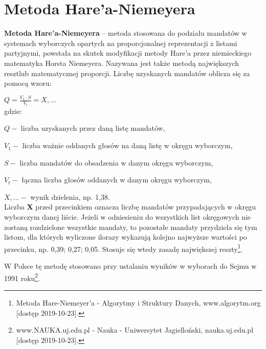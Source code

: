 \documentclass[12pt,a4paper,titlepage]{report}
\begin{document}
\chapter{Metoda Hare’a-Niemeyera}
\textbf{Metoda Hare’a-Niemeyera} – metoda stosowana do podziału mandatów w systemach wyborczych opartych na proporcjonalnej reprezentacji z listami partyjnymi, powstała na skutek modyfikacji metody Hare’a przez niemieckiego matematyka Horsta Niemeyera. Nazywana jest także metodą największych reszt\footnotemark[1] lub matematycznej proporcji.
Liczbę uzyskanych mandatów oblicza się za pomocą wzoru\footnotemark[1]:

\begin{math} Q={\frac {V_{1}\cdot S}{V_{t}}}=X,...\end{math}\\
gdzie:

\begin{math}Q-\end{math} liczba uzyskanych przez daną listę mandatów,

\begin{math}V_1-\end{math} liczba ważnie oddanych głosów na daną listę w okręgu wyborczym,

\begin{math}S-\end{math} liczba mandatów do obsadzenia w danym okręgu wyborczym,

\begin{math}V_t-\end{math} łączna liczba głosów oddanych w danym okręgu wyborczym,

\begin{math}X,...-\end{math} wynik dzielenia, np. 1,38. \\
Liczba \textbf{X} przed przecinkiem oznacza liczbę mandatów przypadających w okręgu wyborczym danej liście. Jeżeli w odniesieniu do wszystkich list okręgowych nie zostaną rozdzielone wszystkie mandaty, to pozostałe mandaty przydziela się tym listom, dla których wyliczone ilorazy wykazują kolejno najwyższe wartości po przecinku, np. 0,39; 0,27; 0,05. Stosuje się wtedy zasadę największej reszty\footnote[1]{Metoda Hare-Niemeyer'a - Algorytmy i Struktury Danych, www.algorytm.org [dostęp 2019-10-23].}.

W Polsce tę metodę stosowano przy ustalaniu wyników w wyborach do Sejmu w 1991 roku\footnote[2]{www.NAUKA.uj.edu.pl - Nauka - Uniwersytet Jagielloński, nauka.uj.edu.pl [dostęp 2019-10-23].}.\cite{wiki:3}
\newpage
\end{document}
